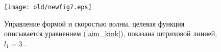%
%
%
%


\begin{figure}[!ht]
	\begin{center}
		\texttt{[image: old/newfig7.eps]}
	\end{center}
	\caption{\label{f:ris7}Управление формой и скоростью волны, целевая функция описывается уравнением (\ref{aim_kink}), показана штриховой линией, $l_1 = 3$ \cite{porant16}.}
\end{figure}

